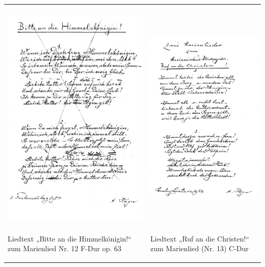 \begin{flushleft}
\tablefirsthead{}
\tablehead{}
\tabletail{}
\tablelasttail{}
\begin{supertabular}{m{7.589cm}m{7.4040003cm}}

\includegraphics[width=7.408cm,height=10.964cm]{pictures/zulassungsarbeit-img069.png}

Liedtext „Bitte an die Himmelkönigin!“
zum Marienlied Nr. 12 F-Dur op. 63 &

\includegraphics[width=7.223cm,height=10.964cm]{pictures/zulassungsarbeit-img070.png}

Liedtext „Ruf an die Christen!“ zum
Marienlied (Nr. 13) C-Dur\\
\end{supertabular}
\end{flushleft}
